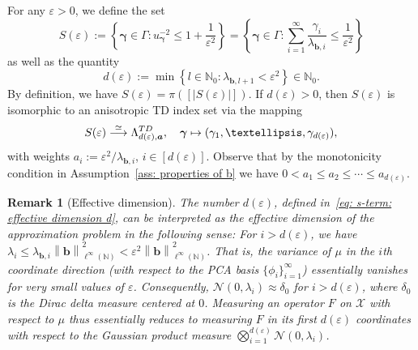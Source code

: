 \documentclass[namedate,webpdf]{ima-authoring-template-blank}
\newcommand*{\nm}[1]{{\left\|#1\right \|}}
\newcommand{\absd}[1]{|#1|}    %
\newcounter{counter}
\numberwithin{counter}{section}
\numberwithin{equation}{section}
\theoremstyle{plain}
\newtheorem{remark}[counter]{Remark}
\theoremstyle{definition}
\newcommand*{\cN}{\mathcal{N}}
\newcommand*{\cX}{\mathcal{X}}
\newcommand*{\bbN}{\mathbb{N}}
\theoremstyle{thmstyletwo}
\begin{document}
For any \(\varepsilon > 0\), we define the set
\begin{equation}
\label{eq: s-term: definition of S_varepsilon}
    S(\varepsilon) := \left\{\bm{\gamma} \in \Gamma: u_{\bm{\gamma}}^{-2} \leq 1 + \frac{1}{\varepsilon^2} \right\}
    = \left\{\bm{\gamma} \in \Gamma: \sum_{i = 1}^{\infty} \frac{\gamma_i}{\lambda_{\bm{b}, i}} \leq \frac{1}{\varepsilon^2} \right\}
\end{equation}
as well as the quantity 
\begin{equation}
\label{eq: s-term: effective dimension d}
    d(\varepsilon)
    := \min \left\{l \in \bbN_0: \lambda_{\bm{b}, l+1} < \varepsilon^2 \right\} \in \bbN_0.
\end{equation}
By definition, we have \(S(\varepsilon) = \pi([\absd{S(\varepsilon)}])\). If \( d(\varepsilon) > 0 \), then \(S(\varepsilon)\) is isomorphic to an anisotropic TD index set via the mapping
\begin{equation}
\label{eq: s-term: S_varepsilon isomorphic to anisotropic TD index set}
    S(\varepsilon) \overset{\simeq}{\longrightarrow} \Lambda_{d(\varepsilon), \bm{a}}^{\textup{TD}}, \quad \bm{\gamma} \mapsto (\gamma_1, \dots, \gamma_{d(\varepsilon)}),
\end{equation}
with weights \(a_i := \varepsilon^2/\lambda_{\bm{b}, i}\), \(i \in [d(\varepsilon)]\).
Observe that by the monotonicity condition in Assumption~\ref{ass: properties of b} we have \(0 < a_1 \leq a_2 \leq \cdots \leq a_{d(\varepsilon)}\).

\begin{remark}[Effective dimension]
    The number \(d(\varepsilon)\), defined in~\eqref{eq: s-term: effective dimension d}, can be interpreted as the \emph{effective dimension} of the approximation problem in the following sense: For \(i > d(\varepsilon)\), we have \( \lambda_i \leq \lambda_{\bm{b}, i} \nm{\bm{b}}_{\ell^{\infty}(\bbN)}^2 < \varepsilon^2 \nm{\bm{b}}_{\ell^{\infty}(\bbN)}^2 \). That is, the variance of \(\mu\) in the \(i\)th coordinate direction (with respect to the PCA basis \(\{\phi_i\}_{i=1}^{\infty}\)) essentially vanishes for very small values of \(\varepsilon\). Consequently, \(\cN(0, \lambda_i) \approx \delta_0\) for \(i > d(\varepsilon)\), where \(\delta_0\) is the Dirac delta measure centered at \(0\). Measuring an operator \(F\) on \(\cX\) with respect to \(\mu\) thus essentially reduces to measuring \(F\) in its first \(d(\varepsilon)\) coordinates with respect to the Gaussian product measure \(\bigotimes_{i = 1}^{d(\varepsilon)} \cN(0, \lambda_i)\).
\end{remark}
\end{document}
